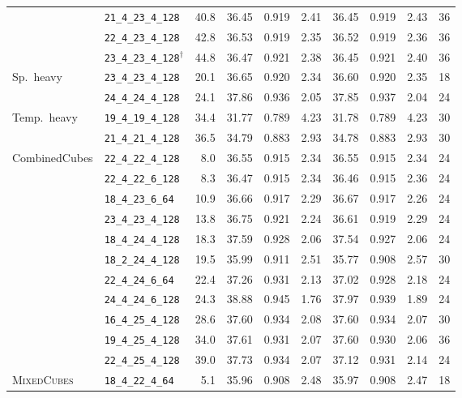\documentclass[12pt, a4paper, twoside]{report}
\newcommand{\MixedCubes}{\textsc{MixedCubes}}
\begin{document}
\begin{table}[htbp]
\begin{adjustwidth}{-3cm}{-1cm}
\begin{tabular}{llrrrrrrrr}
   & \texttt{21\_4\_23\_4\_128} & 40.8 & 36.45 & 0.919 & 2.41 & 36.45 & 0.919 & 2.43 & 36 \\
   & \texttt{22\_4\_23\_4\_128} & 42.8 & 36.53 & 0.919 & 2.35 & 36.52 & 0.919 & 2.36 & 36 \\
   & \texttt{23\_4\_23\_4\_128}$^\dagger$ & 44.8 & 36.47 & 0.921 & 2.38 & 36.45 & 0.921 & 2.40 & 36 \\
\addlinespace
  Sp.~heavy & \texttt{23\_4\_23\_4\_128} & 20.1 & 36.65 & 0.920 & 2.34 & 36.60 & 0.920 & 2.35 & 18 \\
   & \texttt{24\_4\_24\_4\_128} & 24.1 & 37.86 & 0.936 & 2.05 & 37.85 & 0.937 & 2.04 & 24 \\
\addlinespace
  Temp.~heavy & \texttt{19\_4\_19\_4\_128} & 34.4 & 31.77 & 0.789 & 4.23 & 31.78 & 0.789 & 4.23 & 30 \\
   & \texttt{21\_4\_21\_4\_128} & 36.5 & 34.79 & 0.883 & 2.93 & 34.78 & 0.883 & 2.93 & 30 \\
\addlinespace
  CombinedCubes & \texttt{22\_4\_22\_4\_128} &  8.0 & 36.55 & 0.915 & 2.34 & 36.55 & 0.915 & 2.34 & 24 \\
   & \texttt{22\_4\_22\_6\_128} &  8.3 & 36.47 & 0.915 & 2.34 & 36.46 & 0.915 & 2.36 & 24 \\
   & \texttt{18\_4\_23\_6\_64} & 10.9 & 36.66 & 0.917 & 2.29 & 36.67 & 0.917 & 2.26 & 24 \\
   & \texttt{23\_4\_23\_4\_128} & 13.8 & 36.75 & 0.921 & 2.24 & 36.61 & 0.919 & 2.29 & 24 \\
   & \texttt{18\_4\_24\_4\_128} & 18.3 & 37.59 & 0.928 & 2.06 & 37.54 & 0.927 & 2.06 & 24 \\
   & \texttt{18\_2\_24\_4\_128} & 19.5 & 35.99 & 0.911 & 2.51 & 35.77 & 0.908 & 2.57 & 30 \\
   & \texttt{22\_4\_24\_6\_64} & 22.4 & 37.26 & 0.931 & 2.13 & 37.02 & 0.928 & 2.18 & 24 \\
   & \texttt{24\_4\_24\_6\_128} & 24.3 & 38.88 & 0.945 & 1.76 & 37.97 & 0.939 & 1.89 & 24 \\
   & \texttt{16\_4\_25\_4\_128} & 28.6 & 37.60 & 0.934 & 2.08 & 37.60 & 0.934 & 2.07 & 30 \\
   & \texttt{19\_4\_25\_4\_128} & 34.0 & 37.61 & 0.931 & 2.07 & 37.60 & 0.930 & 2.06 & 36 \\
   & \texttt{22\_4\_25\_4\_128} & 39.0 & 37.73 & 0.934 & 2.07 & 37.12 & 0.931 & 2.14 & 24 \\
\addlinespace
  \MixedCubes{} & \texttt{18\_4\_22\_4\_64} &  5.1 & 35.96 & 0.908 & 2.48 & 35.97 & 0.908 & 2.47 & 18 \\

\end{tabular}
\end{adjustwidth}
\end{table}
\end{document}
